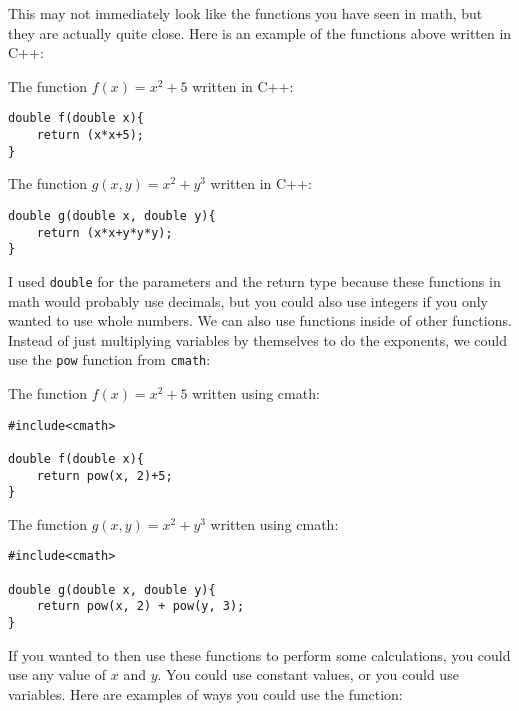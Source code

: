 This may not immediately look like the functions you have seen in math, but they are actually quite close. Here is an example of the functions above written in C++:

\begin{example}
    The function $f(x) = x^2 + 5$ written in C++:

    \begin{verbatim}
double f(double x){
    return (x*x+5);
}
    \end{verbatim}
\end{example}

\begin{example}
    The function $g(x,y) = x^2+y^3$ written in C++:

    \begin{verbatim}
double g(double x, double y){
    return (x*x+y*y*y);
} 
    \end{verbatim}
\end{example}

I used \texttt{double} for the parameters and the return type because these functions in math would probably use decimals, but you could also use integers if you only wanted to use whole numbers. We can also use functions inside of other functions. Instead of just multiplying variables by themselves to do the exponents, we could use the \texttt{pow} function from \texttt{cmath}:

\begin{example}
    The function $f(x) = x^2 + 5$ written using cmath:

    \begin{verbatim}
#include<cmath>

double f(double x){
    return pow(x, 2)+5;
}
    \end{verbatim}
\end{example}

\begin{example}
    The function $g(x,y) = x^2+y^3$ written using cmath:

    \begin{verbatim}
#include<cmath>

double g(double x, double y){
    return pow(x, 2) + pow(y, 3);
} 
    \end{verbatim}
\end{example}

If you wanted to then use these functions to perform some calculations, you could use any value of $x$ and $y$. You could use constant values, or you could use variables. Here are examples of ways you could use the function:


